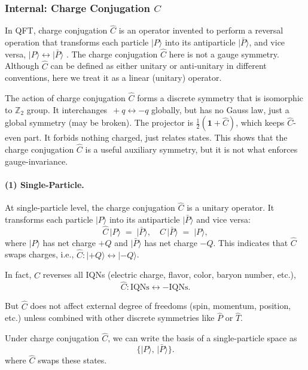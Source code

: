 \documentclass[12pt,a4paper]{article}
\begin{document}
\subsubsection{Internal: Charge Conjugation $\hat{C}$}


In QFT, charge conjugation $\hat{C}$ is an operator invented to perform a reversal operation that transforms each particle $\lvert P\rangle$ into its antiparticle $\lvert \bar{P} \rangle$, and vice versa, $\lvert P\rangle \leftrightarrow \lvert \bar{P} \rangle$ \cite{WWW1952,Luders1954}.
The charge conjugation $\hat{C}$ here is not a gauge symmetry.
Although $\hat{C}$ can be defined as either unitary or anti‑unitary in different conventions, here we treat it as a linear (unitary) operator.


The action of charge conjugation $\hat{C}$ forms a discrete symmetry that is isomorphic to $\mathbb Z_{2}$ group.
It interchanges $\,+q \leftrightarrow -q$ globally, but has no Gauss law, just a global symmetry (may be broken).
The projector is $\frac12(\mathbf 1+\hat C)$, which keeps $\hat C$-even part.
It forbids nothing charged, just relates states.
This shows that the charge conjugation $\hat{C}$ is a useful auxiliary symmetry, but it is not what enforces gauge-invariance.



\paragraph{(1) Single-Particle.}
At single-particle level, the charge conjugation $\hat{C}$ is a unitary operator.
It transforms each particle $\lvert P\rangle$ into its antiparticle $\lvert \bar{P} \rangle$ and vice versa:
$$
\hat{C}\,\lvert P\rangle \;=\; \lvert \bar{P}\rangle,
\quad
\hat{C}\,\lvert \bar{P}\rangle \;=\; \lvert P\rangle,
$$
where $\lvert P\rangle$ has net charge $+Q$ and $\lvert \bar{P}\rangle$ has net charge $-Q$. This indicates that $\hat{C}$ swaps charges, i.e., $\hat{C}: \lvert +Q\rangle\leftrightarrow \lvert -Q\rangle$.
	
In fact, $\hat{C}$ reverses all IQNs (electric charge, flavor, color, baryon number, etc.), 
$$
\hat{C}: \text{IQNs} \leftrightarrow - \text{IQNs}.
$$
	
But $\hat{C}$ does not affect external degree of freedoms (spin, momentum, position, etc.) unless combined with other discrete symmetries like $\hat{P}$ or $\hat{T}$.


Under charge conjugation $\hat{C}$, we can write the basis of a single-particle space as 
$$
\{\lvert P\rangle,\,\lvert \bar{P}\rangle\}.
$$
where $\hat{C}$ swaps these states.
\end{document}
